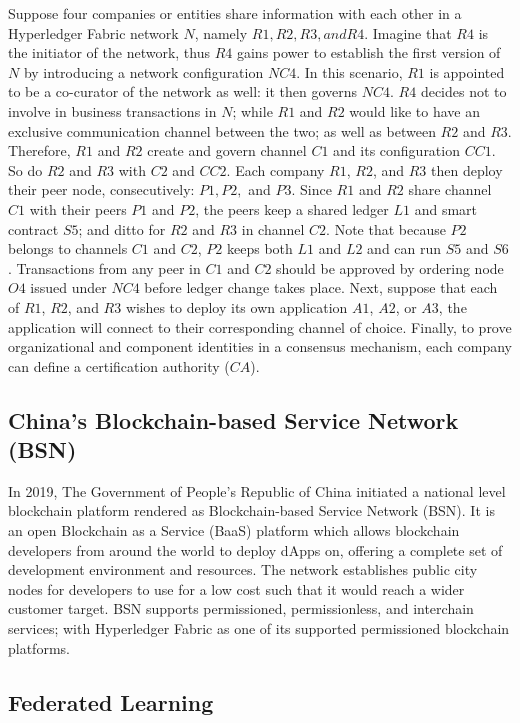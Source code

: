 \documentclass[a4paper,12pt,oneside, utf8x]{report}
\begin{document}
Suppose four companies or entities share information with each other in a Hyperledger Fabric network $N$, namely $R1, R2, R3, and R4$. Imagine that $R4$ is the initiator of the network, thus $R4$ gains power to establish the first version of $N$ by introducing a network configuration $NC4$. In this scenario, $R1$ is appointed to be a co-curator of the network as well: it then governs $NC4$. $R4$ decides not to involve in business transactions in $N$; while $R1$ and $R2$ would like to have an exclusive communication channel between the two; as well as between $R2$ and $R3$. Therefore, $R1$ and $R2$ create and govern channel $C1$ and its configuration $CC1$. So do $R2$ and $R3$ with $C2$ and $CC2$. Each company $R1$, $R2$, and $R3$ then deploy their peer node, consecutively: $P1, P2,$ and $P3$. Since $R1$ and $R2$ share channel $C1$ with their peers $P1$ and $P2$, the peers keep a shared ledger $L1$ and smart contract $S5$; and ditto for $R2$ and $R3$ in channel $C2$. Note that because $P2$ belongs to channels $C1$ and $C2$, $P2$ keeps both $L1$ and $L2$ and can run $S5$ and $S6$. Transactions from any peer in $C1$ and $C2$ should be approved by ordering node $O4$ issued under $NC4$ before ledger change takes place. Next, suppose that each of $R1$, $R2$, and $R3$ wishes to deploy its own application $A1$, $A2$, or $A3$, the application will connect to their corresponding channel of choice. Finally, to prove organizational and component identities in a consensus mechanism, each company can define a certification authority ($CA$).

\subsection{China’s Blockchain-based Service Network (BSN) \cite{a8,a27}}
In 2019, The Government of People’s Republic of China initiated a national level blockchain platform rendered as Blockchain-based Service Network (BSN). It is an open Blockchain as a Service (BaaS) platform which allows blockchain developers from around the world to deploy dApps on, offering a complete set of development environment and resources. The network establishes public city nodes for developers to use for a low cost such that it would reach a wider customer target. BSN supports permissioned, permissionless, and interchain services; with Hyperledger Fabric as one of its supported permissioned blockchain platforms.

\subsection{Federated Learning}
\end{document}
